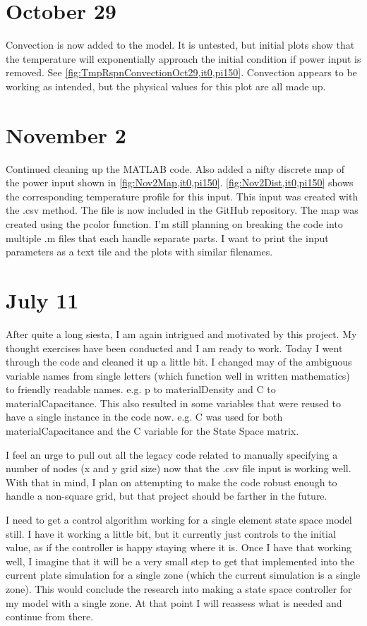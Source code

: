 \documentclass[10pt,twocolumn]{article}
\begin{document}
\section{October 29}
Convection is now added to the model. It is untested, but initial plots show that the temperature will exponentially approach the initial condition if power input is removed. See \autoref{fig:TmpRspnConvectionOct29,it0,pi150}. Convection appears to be working as intended, but the physical values for this plot are all made up.

\section{November 2}
Continued cleaning up the MATLAB code. Also added a nifty discrete map of the power input shown in \autoref{fig:Nov2Map,it0,pi150}. \autoref{fig:Nov2Dist,it0,pi150} shows the corresponding temperature profile for this input. This input was created with the .csv method. The file is now included in the GitHub repository. The map was created using the pcolor function. I'm still planning on breaking the code into multiple .m files that each handle separate parts. I want to print the input parameters as a text tile and the plots with similar filenames.

\section{July 11}
After quite a long siesta, I am again intrigued and motivated by this project. My thought exercises have been conducted and I am ready to work. Today I went through the code and cleaned it up a little bit. I changed may of the ambiguous variable names from single letters (which function well in written mathematics) to friendly readable names. e.g. p to materialDensity and C to materialCapacitance. This also resulted in some variables that were reused to have a single instance in the code now. e.g. C was used for both materialCapacitance and the C variable for the State Space matrix.

I feel an urge to pull out all the legacy code related to manually specifying a number of nodes (x and y grid size) now that the .csv file input is working well. With that in mind, I plan on attempting to make the code robust enough to handle a non-square grid, but that project should be farther in the future.

I need to get a control algorithm working for a single element state space model still. I have it working a little bit, but it currently just controls to the initial value, as if the controller is happy staying where it is. Once I have that working well, I imagine that it will be a very small step to get that implemented into the current plate simulation for a single zone (which the current simulation is a single zone). This would conclude the research into making a state space controller for my model with a single zone. At that point I will reassess what is needed and continue from there.
\end{document}
